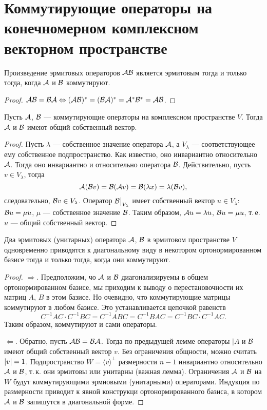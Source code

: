 \section{Коммутирующие операторы на конечномерном комплексном векторном пространстве}

\begin{theorem}
    Произведение эрмитовых операторов $\mathcal{A}\mathcal{B}$ является эрмитовым тогда и только тогда, когда $\mathcal{A}$ и $\mathcal{B}$ коммутируют.
\end{theorem}

\begin{proof}
    $\mathcal{A}\mathcal{B} = \mathcal{B}\mathcal{A} \Leftrightarrow (\mathcal{A}\mathcal{B})^\ast = (\mathcal{B}\mathcal{A})^\ast = \mathcal{A}^\ast\mathcal{B}^\ast = \mathcal{A}\mathcal{B}$.
\end{proof}

\begin{lemma}
    Пусть $\mathcal{A}$, $\mathcal{B}$ --- коммутирующие операторы на комплексном пространстве $V$. Тогда $\mathcal{A}$ и $\mathcal{B}$ имеют общий собственный вектор.
\end{lemma}

\begin{proof}
    Пусть $\lambda$ --- собственное значение оператора $\mathcal{A}$, а $V_\lambda$ --- соответствующее ему собственное подпространство. Как известно, оно инвариантно относительно $\mathcal{A}$. Тогда оно инвариантно и относительно оператора $\mathcal{B}$. Действительно, пусть $v \in V_\lambda$, тогда
    \[
        \mathcal{A}(\mathcal{B} v) = \mathcal{B}(\mathcal{A} v) = \mathcal{B}(\lambda x) = \lambda(\mathcal{B} v),
    \]
    следовательно, $\mathcal{B} v \in V_\lambda$. Оператор $\mathcal{B}\big|_{V_\lambda}$ имеет собственный вектор $u \in V_\lambda$: $\mathcal{B} u = \mu u$, $\mu$ --- собственное значение $\mathcal{B}$. Таким образом, $\mathcal{A} u = \lambda u$, $\mathcal{B} u = \mu u$, т.\,е. $u$ --- общий собственный вектор.
\end{proof}

\begin{theorem}
    Два эрмитовых (унитарных) оператора $\mathcal{A}$, $\mathcal{B}$ в эрмитовом пространстве $V$ одновременно приводятся к диагональному виду в некотором ортонормированном базисе тогда и только тогда, когда они коммутируют.
\end{theorem}

\begin{proof}
    $\Rightarrow$. Предположим, чо $\mathcal{A}$ и $\mathcal{B}$ диагонализируемы в общем ортонормированном базисе, мы приходим к выводу о перестановочности их матриц $A$, $B$ в этом базисе. Но очевидно, что коммутирующие матрицы коммутируют в любом базисе. Это устанавливается цепочкой равенств
    \[
        C^{-1}AC \cdot C^{-1}BC = C^{-1}ABC = C^{-1}BAC = C^{-1}BC \cdot C^{-1}AC.
    \]
    Таким образом, коммутируют и сами операторы.

    $\Leftarrow$. Обратно, пусть $\mathcal{A}\mathcal{B} = \mathcal{B}\mathcal{A}$. Тогда по предыдущей лемме операторы $|A$ и $\mathcal{B}$ имеют общий собственный вектор $v$. Без ограничения общности, можно считать $\left\lvert v\right\rvert = 1$. Подпространство $W = \langle v\rangle^\perp$ размерности $n - 1$ инвариантно относительно $\mathcal{A}$ и $\mathcal{B}$, т.\,к. они эрмитовы или унитарны (важная лемма). Ограничения $\mathcal{A}$ и $\mathcal{B}$ на $W$ будут коммутирующими эрмиовыми (унитарными) операторами. Индукция по размерности приводит к явной конструкци ортонормированного базиса, в котором $\mathcal{A}$ и $\mathcal{B}$ запишутся в диагональной форме.
\end{proof}

